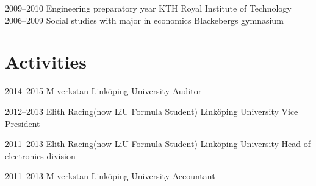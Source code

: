 \documentclass[]{cv-style}          %
\begin{document}
\begin{entrylist}


  \entry
    {2009–2010}
    {Engineering preparatory year}
    {KTH Royal Institute of Technology}
    {}
  \entry
    {2006–2009}
    {Social studies with major in economics}
    {Blackebergs gymnasium}
    {}
\end{entrylist}



\section{Activities}

\begin{entrylist}
  \entry
    {2014–2015}
    {M-verkstan}
    {Linköping University}
    {Auditor}

  \entry
    {2012–2013}
    {Elith Racing(now LiU Formula Student)}
    {Linköping University}
    {Vice President}

  \entry
    {2011–2013}
    {Elith Racing(now LiU Formula Student)}
    {Linköping University}
    {Head of electronics division}

  \entry
    {2011–2013}
    {M-verkstan}
    {Linköping University}
    {Accountant}

\end{entrylist}

\end{document}
